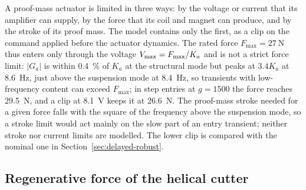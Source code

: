 A proof-mass actuator is limited in three ways: by the voltage or current that its amplifier can supply, by the force that its coil and magnet can produce, and by the stroke of its proof mass. The model contains only the first, as a clip on the command applied before the actuator dynamics. The rated force $F_{\max}=\SI{27}{\newton}$ thus enters only through the voltage $V_{\max}=F_{\max}/K_a$ and is not a strict force limit: $\lvert G_a\rvert$ is within \SI{0.4}{\percent} of $K_a$ at the structural mode but peaks at $3.4K_a$ at \SI{8.6}{\hertz}, just above the suspension mode at \SI{8.4}{\hertz}, so transients with low-frequency content can exceed $F_{\max}$; in step entries at $g=1500$ the force reaches \SI{29.5}{\newton}, and a clip at \SI{8.1}{\volt} keeps it at \SI{26.6}{\newton}. The proof-mass stroke needed for a given force falls with the square of the frequency above the suspension mode, so a stroke limit would act mainly on the slow part of an entry transient; neither stroke nor current limits are modelled. The lower clip is compared with the nominal one in Section~\ref{sec:delayed-robust}.

\subsection{Regenerative force of the helical cutter}\label{sec:model-force}

